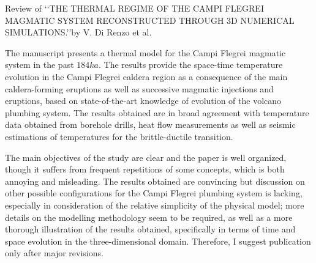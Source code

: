 \documentclass[a4paper,notitlepage]{article}
\begin{document}
%  

\begin{center}
Review of \lq\lq THE THERMAL REGIME OF THE CAMPI FLEGREI MAGMATIC SYSTEM
RECONSTRUCTED THROUGH 3D NUMERICAL SIMULATIONS.\rq\rq by
V. Di Renzo et al.
\end{center}

\vspace{1cm}

The manuscript presents a thermal model for the
Campi Flegrei magmatic system in the past $\unit{184}{ka}$. The
results provide the space-time temperature evolution in the Campi
Flegrei caldera region as a consequence of the main caldera-forming
eruptions as well as successive magmatic injections and eruptions, based on
state-of-the-art knowledge of evolution of the volcano
plumbing system. The results obtained are in broad agreement with
temperature data obtained from borehole drills, heat flow measurements
as well as seismic estimations of temperatures for the brittle-ductile
transition. 

The main objectives of the study are clear and the paper is well
organized, though it suffers from frequent repetitions of some
concepts, which is both annoying and misleading. The results obtained
are convincing but discussion on other possible configurations
for the Campi Flegrei plumbing system is lacking, especially in consideration
of the relative
simplicity of the physical model; more
details on the modelling methodology seem to be required, as well as
a more thorough illustration of the results obtained, specifically in
terms of time and space evolution in the three-dimensional
domain. Therefore, I suggest publication only after major revisions.
\end{document}
